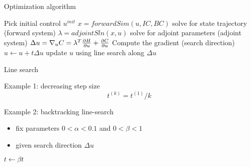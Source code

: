 \begin{frame}{Optimization algorithm}

\begin{algorithm}[H]

\begin{spacing}{1.3}
\begin{algorithmic}
\State Pick initial control $u^{init}$
\State $x = forwardSim(u,IC, BC)$ \hfill solve for state trajectory (forward system)
\State $\lambda = adjointSln(x,u)$ \hfill solve for adjoint parameters (adjoint system)
\State $\Delta u = \nabla_u C = \lambda^T \frac{\partial H}{\partial u} + \frac{\partial C}{\partial u}$ \hfill Compute the gradient (search direction)
\State $ u \gets u + t \Delta u $ \hfill update $u$ using line search along $\Delta u$
\EndWhile
\end{algorithmic}
\end{spacing}

\caption{Gradient descent loop}
\end{algorithm}

\end{frame}


\begin{frame}{Line search}

Example 1: decreasing step size
\[
t^{(k)} = t^{(1)} /k 
\]


Example 2: backtracking line-search
\begin{itemize}
\item fix parameters $ 0 < \alpha < 0.1$ and $0 < \beta < 1$
\item given search direction $\Delta u$
\end{itemize}

\begin{algorithm}[H]
\begin{algorithmic}
\State $t \gets \beta t$
\EndWhile
\end{algorithmic}
\caption{Backtracking line search}
\end{algorithm}

\end{frame}

